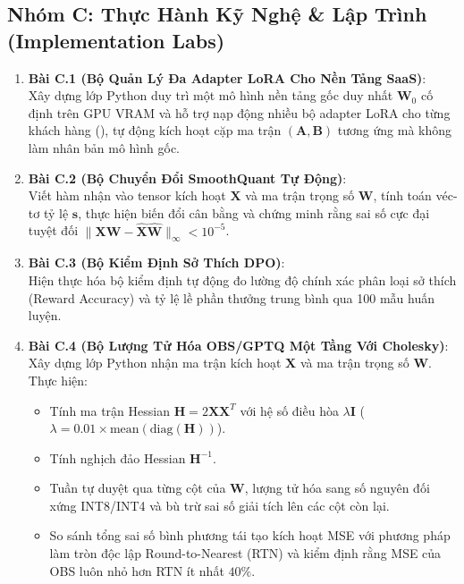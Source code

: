 \subsection{Nhóm C: Thực Hành Kỹ Nghệ \& Lập Trình (Implementation Labs)}
\begin{enumerate}
  \item \textbf{Bài C.1 (Bộ Quản Lý Đa Adapter LoRA Cho Nền Tảng SaaS)}: \\
  Xây dựng lớp Python  duy trì một mô hình nền tảng gốc duy nhất $\mathbf{W}_0$ cố định trên GPU VRAM và hỗ trợ nạp động nhiều bộ adapter LoRA cho từng khách hàng (), tự động kích hoạt cặp ma trận $(\mathbf{A}, \mathbf{B})$ tương ứng mà không làm nhân bản mô hình gốc.

  \item \textbf{Bài C.2 (Bộ Chuyển Đổi SmoothQuant Tự Động)}: \\
  Viết hàm  nhận vào tensor kích hoạt $\mathbf{X}$ và ma trận trọng số $\mathbf{W}$, tính toán véc-tơ tỷ lệ $\mathbf{s}$, thực hiện biến đổi cân bằng và chứng minh rằng sai số cực đại tuyệt đối $\|\mathbf{X}\mathbf{W} - \hat{\mathbf{X}}\hat{\mathbf{W}}\|_\infty < 10^{-5}$.

  \item \textbf{Bài C.3 (Bộ Kiểm Định Sở Thích DPO)}: \\
  Hiện thực hóa bộ kiểm định tự động đo lường độ chính xác phân loại sở thích (Reward Accuracy) và tỷ lệ lề phần thưởng trung bình qua 100 mẫu huấn luyện.

  \item \textbf{Bài C.4 (Bộ Lượng Tử Hóa OBS/GPTQ Một Tầng Với Cholesky)}: \\
  Xây dựng lớp Python  nhận ma trận kích hoạt $\mathbf{X}$ và ma trận trọng số $\mathbf{W}$. Thực hiện:
  \begin{itemize}
    \item Tính ma trận Hessian $\mathbf{H} = 2 \mathbf{X} \mathbf{X}^T$ với hệ số điều hòa $\lambda \mathbf{I}$ ($\lambda = 0.01 \times \text{mean}(\text{diag}(\mathbf{H}))$).
    \item Tính nghịch đảo Hessian $\mathbf{H}^{-1}$.
    \item Tuần tự duyệt qua từng cột của $\mathbf{W}$, lượng tử hóa sang số nguyên đối xứng INT8/INT4 và bù trừ sai số giải tích lên các cột còn lại.
    \item So sánh tổng sai số bình phương tái tạo kích hoạt MSE với phương pháp làm tròn độc lập Round-to-Nearest (RTN) và kiểm định rằng MSE của OBS luôn nhỏ hơn RTN ít nhất $40\%$.
  \end{itemize}


\end{enumerate}
